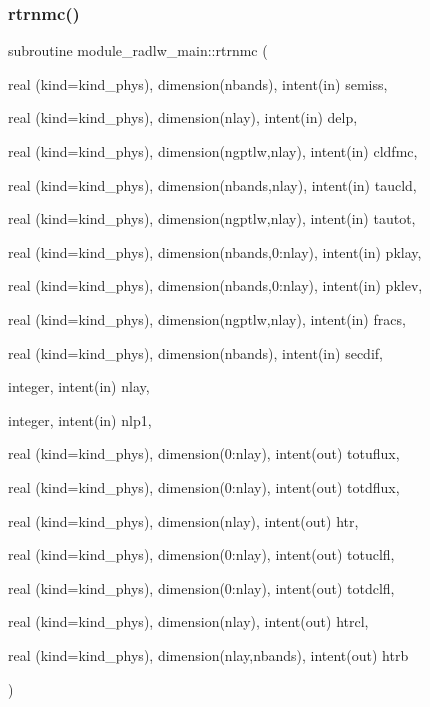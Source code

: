 \subsubsection{\texorpdfstring{rtrnmc()}{rtrnmc()}}
{\footnotesize\ttfamily subroutine module\+\_\+radlw\+\_\+main\+::rtrnmc (\begin{DoxyParamCaption}\item[{real (kind=kind\+\_\+phys), dimension(nbands), intent(in)}]{semiss,  }\item[{real (kind=kind\+\_\+phys), dimension(nlay), intent(in)}]{delp,  }\item[{real (kind=kind\+\_\+phys), dimension(ngptlw,nlay), intent(in)}]{cldfmc,  }\item[{real (kind=kind\+\_\+phys), dimension(nbands,nlay), intent(in)}]{taucld,  }\item[{real (kind=kind\+\_\+phys), dimension(ngptlw,nlay), intent(in)}]{tautot,  }\item[{real (kind=kind\+\_\+phys), dimension(nbands,0\+:nlay), intent(in)}]{pklay,  }\item[{real (kind=kind\+\_\+phys), dimension(nbands,0\+:nlay), intent(in)}]{pklev,  }\item[{real (kind=kind\+\_\+phys), dimension(ngptlw,nlay), intent(in)}]{fracs,  }\item[{real (kind=kind\+\_\+phys), dimension(nbands), intent(in)}]{secdif,  }\item[{integer, intent(in)}]{nlay,  }\item[{integer, intent(in)}]{nlp1,  }\item[{real (kind=kind\+\_\+phys), dimension(0\+:nlay), intent(out)}]{totuflux,  }\item[{real (kind=kind\+\_\+phys), dimension(0\+:nlay), intent(out)}]{totdflux,  }\item[{real (kind=kind\+\_\+phys), dimension(nlay), intent(out)}]{htr,  }\item[{real (kind=kind\+\_\+phys), dimension(0\+:nlay), intent(out)}]{totuclfl,  }\item[{real (kind=kind\+\_\+phys), dimension(0\+:nlay), intent(out)}]{totdclfl,  }\item[{real (kind=kind\+\_\+phys), dimension(nlay), intent(out)}]{htrcl,  }\item[{real (kind=kind\+\_\+phys), dimension(nlay,nbands), intent(out)}]{htrb }\end{DoxyParamCaption})\hspace{0.3cm}{\ttfamily [private]}}


